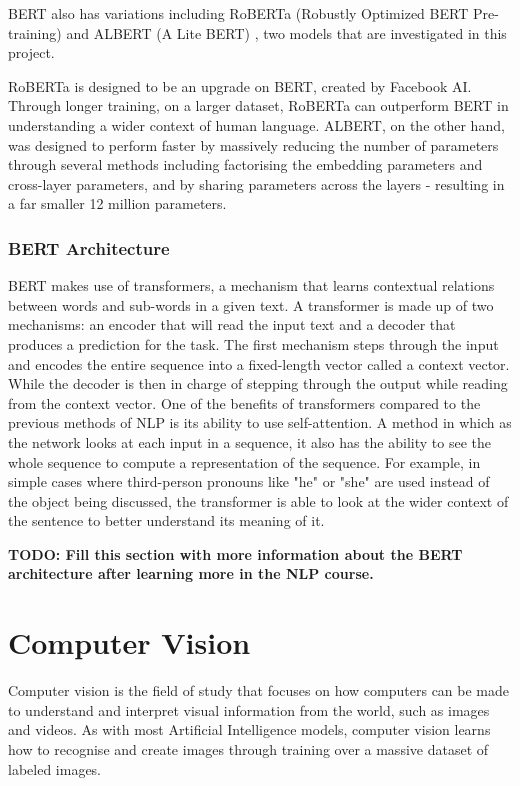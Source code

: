 BERT also has variations including RoBERTa (Robustly Optimized BERT Pre-training) \cite{RoBERTa} and ALBERT (A Lite BERT) \cite{ALBERT}, two models that are investigated in this project. 

RoBERTa is designed to be an upgrade on BERT, created by Facebook AI. Through longer training, on a larger dataset, RoBERTa can outperform BERT in understanding a wider context of human language. ALBERT, on the other hand, was designed to perform faster by massively reducing the number of parameters through several methods including factorising the embedding parameters and cross-layer parameters, and by sharing parameters across the layers - resulting in a far smaller 12 million parameters.

\subsubsection{BERT Architecture}

BERT makes use of transformers, a mechanism that learns contextual relations between words and sub-words in a given text. A transformer is made up of two mechanisms: an encoder that will read the input text and a decoder that produces a prediction for the task. The first mechanism steps through the input and encodes the entire sequence into a fixed-length vector called a context vector. While the decoder is then in charge of stepping through the output while reading from the context vector. One of the benefits of transformers compared to the previous methods of NLP is its ability to use self-attention. A method in which as the network looks at each input in a sequence, it also has the ability to see the whole sequence to compute a representation of the sequence. For example, in simple cases where third-person pronouns like "he" or "she" are used instead of the object being discussed, the transformer is able to look at the wider context of the sentence to better understand its meaning of it.

\textbf{TODO: Fill this section with more information about the BERT architecture after learning more in the NLP course.}

\section{Computer Vision}

Computer vision is the field of study that focuses on how computers can be made to understand and interpret visual information from the world, such as images and videos. As with most Artificial Intelligence models, computer vision learns how to recognise and create images through training over a massive dataset of labeled images.

